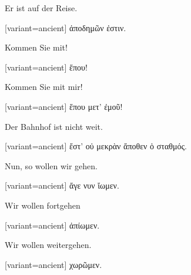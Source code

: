 Er ist auf der Reise.

\switchcolumn

\begin{greek}[variant=ancient]%
ἀποδημῶν ἐστιν.

\end{greek}%
\indent Kommen Sie mit!

\switchcolumn

\begin{greek}[variant=ancient]%
ἕπου!

\end{greek}%
\switchcolumn*

Kommen Sie mit mir!

\switchcolumn

\begin{greek}[variant=ancient]%
ἕπου μετ' ἐμοῦ!

\end{greek}%
\switchcolumn*

Der Bahnhof ist nicht weit.

\switchcolumn

\begin{greek}[variant=ancient]%
ἔστ' οὐ μεκρὰν ἄποθεν ὁ σταθμός.

\end{greek}%
\switchcolumn*

Nun, so wollen wir gehen.

\switchcolumn

\begin{greek}[variant=ancient]%
ἄγε νυν ἴωμεν.

\end{greek}%
\switchcolumn*

Wir wollen fortgehen

\switchcolumn

\begin{greek}[variant=ancient]%
ἀπίωμεν.

\end{greek}%
\switchcolumn*

Wir wollen weitergehen.

\switchcolumn

\begin{greek}[variant=ancient]%
χωρῶμεν.

\end{greek}%
\switchcolumn*

